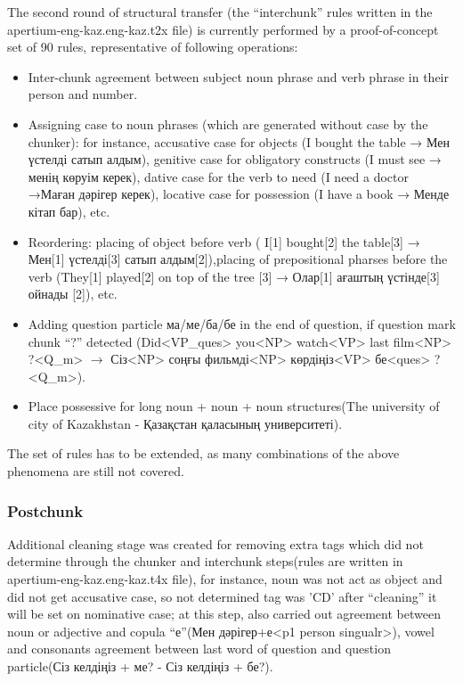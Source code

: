 \documentclass[11pt]{article}
\begin{document}
The second round of structural transfer (the “interchunk” rules written in the apertium-eng-kaz.eng-kaz.t2x file) is currently performed by a proof-of-concept set of 90 rules, representative of following operations:
\begin{itemize}
\item Inter-chunk agreement between subject noun phrase and verb phrase in their person and number.
\item Assigning case to noun phrases (which are generated without case by the chunker): for instance, accusative case for objects (I bought the table → Мен үстелді  сатып алдым), genitive case for obligatory constructs (I must see → менің көруім керек),  dative case for the verb to need (I need a doctor →Маған дәрігер керек), locative case for possession (I have a book → Менде кітап бар), etc.
\item Reordering: placing of object before verb ( I[1] bought[2] the table[3] → Мен[1] үстелді[3] сатып алдым[2]),placing of prepositional pharses before the verb  (They[1] played[2] on top of the tree [3] → Олар[1] ағаштың үстінде[3] ойнады [2]), etc.
\item Adding question particle ма/ме/ба/бе in the end of question, if question mark chunk “?” detected (Did<VP\_ques> you<NP> watch<VP> last film<NP> ?<Q\_m> $\rightarrow$ Сіз<NP> соңғы фильмді<NP> көрдіңіз<VP> бе<ques> ?<Q\_m>).
\item Place possessive for long noun + noun + noun structures(The university of city of Kazakhstan - Қазақстан  қаласының университеті).
\end{itemize}
The set of rules has to be extended, as many combinations of the above phenomena are still not covered.

\subsubsection{Postchunk}

Additional cleaning stage was created for removing extra tags which did not determine through the chunker and interchunk steps(rules are written in  apertium-eng-kaz.eng-kaz.t4x file), for instance, noun was not act as object and did not get accusative case, so not determined tag was 'CD' after “cleaning” it will be set on nominative case; at this step, also carried out agreement between noun or adjective and copula “е”(Мен дәрігер+е<p1 person singualr>), vowel and consonants agreement between last word of question and question particle(Сіз келдіңіз + ме? - Сіз келдіңіз + бе?).
\end{document}
